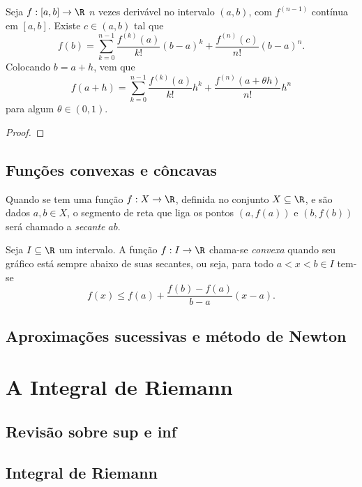 \documentclass{article}
\begin{document}
\begin{thm} 
    Seja \(f: [a,b] \to \R\) \(n\) vezes derivável no intervalo \((a,b)\), com \(f^{(n-1)}\) contínua em \([a,b]\). Existe \(c \in (a,b)\) tal que \[f(b) = \sum_{k=0}^{n-1} \frac{f^{(k)}(a)}{k!} (b-a)^k + \frac{f^{(n)}(c)}{n!} (b-a)^n.\]
    Colocando \(b=a+h\), vem que \[f(a+h) = \sum_{k=0}^{n-1} \frac{f^{(k)}(a)}{k!} h^k + \frac{f^{(n)}(a+\theta h)}{n!} h^n\] para algum \(\theta \in (0,1)\).
\end{thm}

\begin{proof}
    
\end{proof}

\subsection{Funções convexas e côncavas}

\begin{defn}
    Quando se tem uma função \(f: X \to \R\), definida no conjunto \(X \subseteq \R\), e são dados \(a,b \in X\), o segmento de reta que liga os pontos \((a,f(a))\) e \((b,f(b))\) será chamado a \emph{secante} \(ab\).
\end{defn}

\begin{defn}
    Seja \(I \subseteq \R\) um intervalo. A função \(f: I \to \R\) chama-se \emph{convexa} quando seu gráfico está sempre abaixo de suas secantes, ou seja, para todo \(a<x<b \in I\) tem-se
    \[
        f(x) \leq f(a) + \frac{f(b)-f(a)}{b-a} (x-a).
    \]
\end{defn}

\subsection{Aproximações sucessivas e método de Newton}


\section{A Integral de Riemann}
\subsection{Revisão sobre sup e inf}
\subsection{Integral de Riemann}
\end{document}
